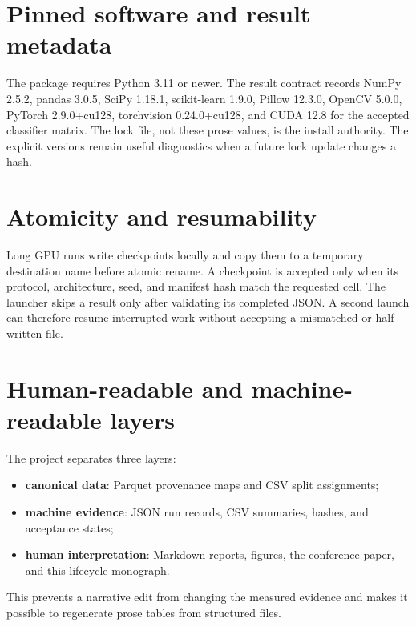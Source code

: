 \section{Pinned software and result metadata}

The package requires Python 3.11 or newer. The result contract records NumPy 2.5.2, pandas 3.0.5, SciPy 1.18.1, scikit-learn 1.9.0, Pillow 12.3.0, OpenCV 5.0.0, PyTorch 2.9.0+cu128, torchvision 0.24.0+cu128, and CUDA 12.8 for the accepted classifier matrix. The lock file, not these prose values, is the install authority. The explicit versions remain useful diagnostics when a future lock update changes a hash.

\section{Atomicity and resumability}

Long GPU runs write checkpoints locally and copy them to a temporary destination name before atomic rename. A checkpoint is accepted only when its protocol, architecture, seed, and manifest hash match the requested cell. The launcher skips a result only after validating its completed JSON. A second launch can therefore resume interrupted work without accepting a mismatched or half-written file.

\section{Human-readable and machine-readable layers}

The project separates three layers:
\begin{itemize}
  \item \textbf{canonical data}: Parquet provenance maps and CSV split assignments;
  \item \textbf{machine evidence}: JSON run records, CSV summaries, hashes, and acceptance states;
  \item \textbf{human interpretation}: Markdown reports, figures, the conference paper, and this lifecycle monograph.
\end{itemize}
This prevents a narrative edit from changing the measured evidence and makes it possible to regenerate prose tables from structured files.
